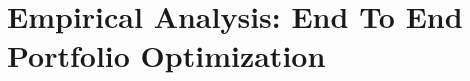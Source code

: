 \chapter{Empirical Analysis: End To End Portfolio Optimization}\label{chap:end-to-end-portfolio-optimization}

 